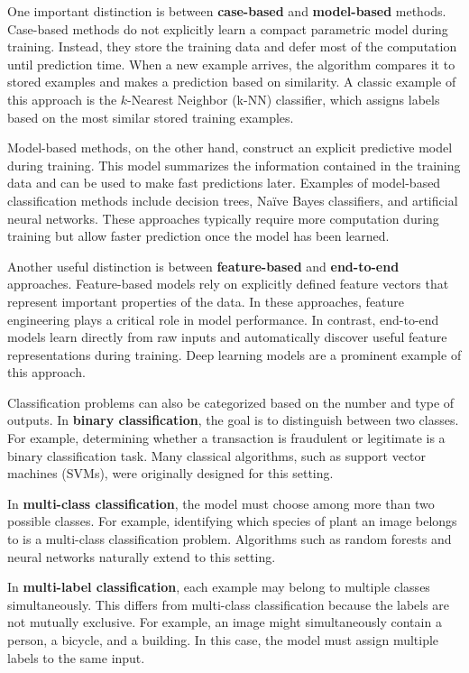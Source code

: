 \documentclass{article}
\begin{document}
One important distinction is between \textbf{case-based} and \textbf{model-based} methods. Case-based methods do not explicitly learn a compact parametric model during training. Instead, they store the training data and defer most of the computation until prediction time. When a new example arrives, the algorithm compares it to stored examples and makes a prediction based on similarity. A classic example of this approach is the $k$-Nearest Neighbor (k-NN) classifier, which assigns labels based on the most similar stored training examples.

Model-based methods, on the other hand, construct an explicit predictive model during training. This model summarizes the information contained in the training data and can be used to make fast predictions later. Examples of model-based classification methods include decision trees, Na\"ive Bayes classifiers, and artificial neural networks. These approaches typically require more computation during training but allow faster prediction once the model has been learned.

Another useful distinction is between \textbf{feature-based} and \textbf{end-to-end} approaches. Feature-based models rely on explicitly defined feature vectors that represent important properties of the data. In these approaches, feature engineering plays a critical role in model performance. In contrast, end-to-end models learn directly from raw inputs and automatically discover useful feature representations during training. Deep learning models are a prominent example of this approach.

Classification problems can also be categorized based on the number and type of outputs. In \textbf{binary classification}, the goal is to distinguish between two classes. For example, determining whether a transaction is fraudulent or legitimate is a binary classification task. Many classical algorithms, such as support vector machines (SVMs), were originally designed for this setting.

In \textbf{multi-class classification}, the model must choose among more than two possible classes. For example, identifying which species of plant an image belongs to is a multi-class classification problem. Algorithms such as random forests and neural networks naturally extend to this setting.

In \textbf{multi-label classification}, each example may belong to multiple classes simultaneously. This differs from multi-class classification because the labels are not mutually exclusive. For example, an image might simultaneously contain a person, a bicycle, and a building. In this case, the model must assign multiple labels to the same input.
\end{document}
